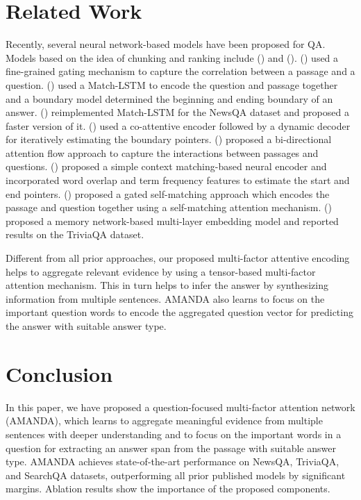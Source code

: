 \documentclass[letterpaper]{article}
\begin{document}
\section{Related Work}
\label{sec:related_works}
Recently, several neural network-based models have been proposed for QA.
Models based on the idea of chunking and ranking include \citeauthor{ibm_squad} (\citeyear{ibm_squad}) and \citeauthor{google_squad} (\citeyear{google_squad}).
\citeauthor{cmu_squad} (\citeyear{cmu_squad}) used a fine-grained gating mechanism to capture the correlation between a passage and a question.
\citeauthor{smu_squad} (\citeyear{smu_squad}) used a Match-LSTM to encode the question and passage together and a boundary model determined the beginning and ending boundary of an answer.
\citeauthor{newsqa} (\citeyear{newsqa}) reimplemented Match-LSTM for the NewsQA dataset and proposed a faster version of it.
\citeauthor{salesforce_squad} (\citeyear{salesforce_squad}) used a co-attentive encoder followed by a dynamic decoder for iteratively estimating the boundary pointers.
\citeauthor{allenai_squad} (\citeyear{allenai_squad}) proposed a bi-directional attention flow approach to capture the interactions between passages and questions.
\citeauthor{fastqa_squad} (\citeyear{fastqa_squad}) proposed a simple context matching-based neural encoder and incorporated word overlap and term frequency features to estimate the start and end pointers.
\citeauthor{rnet_squad} (\citeyear{rnet_squad}) proposed a gated self-matching approach which encodes the passage and question together using a self-matching attention mechanism.
\citeauthor{memen} (\citeyear{memen}) proposed a memory network-based multi-layer embedding model and reported results on the TriviaQA dataset.

Different from all prior approaches, our proposed multi-factor attentive encoding helps to aggregate relevant evidence by using a tensor-based multi-factor attention mechanism. This in turn helps to infer the answer by synthesizing information from multiple sentences.
AMANDA also learns to focus on the important question words to encode the aggregated question vector for predicting the answer with suitable answer type.
\section{Conclusion}
In this paper, we have proposed a question-focused multi-factor attention network (AMANDA), which learns to aggregate meaningful evidence from multiple sentences with deeper understanding and to focus on the important words in a question for extracting an answer span from the passage with suitable answer type. AMANDA achieves state-of-the-art performance on NewsQA, TriviaQA, and SearchQA datasets, outperforming all prior published models by significant margins. Ablation results show the importance of the proposed components.
\end{document}

